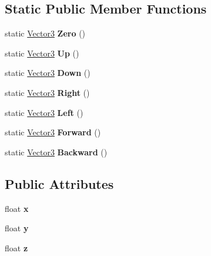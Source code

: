 \subsection*{Static Public Member Functions}
\begin{DoxyCompactItemize}
\item 
\hypertarget{class_vector3_a9097c907dc335cd65a8778c49d2c20e6}{static \hyperlink{class_vector3}{Vector3} {\bfseries Zero} ()}\label{class_vector3_a9097c907dc335cd65a8778c49d2c20e6}

\item 
\hypertarget{class_vector3_af76fa375f0bcb959fa0779e432c0da30}{static \hyperlink{class_vector3}{Vector3} {\bfseries Up} ()}\label{class_vector3_af76fa375f0bcb959fa0779e432c0da30}

\item 
\hypertarget{class_vector3_a8c1d41aeb980f224d40e9b3aec0e6e5d}{static \hyperlink{class_vector3}{Vector3} {\bfseries Down} ()}\label{class_vector3_a8c1d41aeb980f224d40e9b3aec0e6e5d}

\item 
\hypertarget{class_vector3_a4f65ccf4ea621834c5647f44c52660ed}{static \hyperlink{class_vector3}{Vector3} {\bfseries Right} ()}\label{class_vector3_a4f65ccf4ea621834c5647f44c52660ed}

\item 
\hypertarget{class_vector3_af5123ab6c6847af7b19bf2c90f7097fc}{static \hyperlink{class_vector3}{Vector3} {\bfseries Left} ()}\label{class_vector3_af5123ab6c6847af7b19bf2c90f7097fc}

\item 
\hypertarget{class_vector3_ab93e21f3b84ec41003502823017cf920}{static \hyperlink{class_vector3}{Vector3} {\bfseries Forward} ()}\label{class_vector3_ab93e21f3b84ec41003502823017cf920}

\item 
\hypertarget{class_vector3_a29a4316d2d8b3861d7fc286c264f3c51}{static \hyperlink{class_vector3}{Vector3} {\bfseries Backward} ()}\label{class_vector3_a29a4316d2d8b3861d7fc286c264f3c51}

\end{DoxyCompactItemize}
\subsection*{Public Attributes}
\begin{DoxyCompactItemize}
\item 
\hypertarget{class_vector3_a7e2d3237b29a2f29d7b3d8b2934e35f2}{float {\bfseries x}}\label{class_vector3_a7e2d3237b29a2f29d7b3d8b2934e35f2}

\item 
\hypertarget{class_vector3_a86eb35a9fa2d5a49e7fad66a35fa9c13}{float {\bfseries y}}\label{class_vector3_a86eb35a9fa2d5a49e7fad66a35fa9c13}

\item 
\hypertarget{class_vector3_aa8c9461eb24bd2c364258078811a3e9d}{float {\bfseries z}}\label{class_vector3_aa8c9461eb24bd2c364258078811a3e9d}

\end{DoxyCompactItemize}
